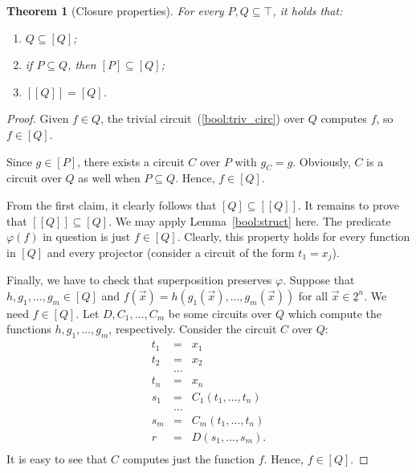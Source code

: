 \documentclass[12pt,notitlepage]{article}
\theoremstyle{plain}
\newtheorem{thm}{Theorem}[section]
\theoremstyle{definition}
\theoremstyle{plain}
\newcommand{\sbs}{\subseteq}
\renewcommand{\phi}{\varphi}
\newcommand{\ul}[1]{\underline{#1}}
\newcommand{\1}{\mathbf{1}}
\newcommand{\0}{\mathbf{0}}
\newcommand{\mcomm}[1]{}
\begin{document}
\mcomm{This lemma reduces the inductive definition for clones to our chosen function `representation', be it a circuit, a formula or whatever. It states that $[Q]$ (as defined in representation terms) is included into every clone containing $Q$. On the other hand, the following theorem implies that $[Q]$ is indeed a clone (that is, $\bot \sbs Q$ and $[Q]$ is closed under superposition) and contains $Q$. So, $[Q]$ is the ${\sbs}$-least clone containing $Q$; this provides an abstraction layer allowing to mention no circuits in most of the subsequent arguments. We do not do so, nevertheless. If the Instructor likes this approach, he might want to add an explicit lemma stating $[Q]$ to be a clone.}
\begin{thm}[Closure properties]\label{bool:closure}
For every $P, Q \sbs \top$, it holds that:
\begin{enumerate}
\item $Q \sbs [Q]$;
\item if $P \sbs Q$, then $[P] \sbs [Q]$;
\item $[[Q]] = [Q]$.
\end{enumerate}
\end{thm}
\begin{proof}
Given $f \in Q$, the trivial circuit~(\ref{bool:triv_circ}) over $Q$ computes $f$, so $f \in [Q]$.

Since $g \in [P]$, there exists a circuit $C$ over $P$ with $g_C = g$. Obviously, $C$ is a circuit over $Q$ as well when $P \sbs Q$. Hence, $f \in [Q]$.

From the first claim, it clearly follows that $[Q] \sbs [[Q]]$. It remains to prove that $[[Q]] \sbs [Q]$. We may apply Lemma~\ref{bool:struct} here. The predicate $\phi(f)$ in question is just $f \in [Q]$. Clearly, this property holds for every function in $[Q]$ and every projector (consider a circuit of the form $t_1 = x_j$).

Finally, we have to check that superposition preserves $\phi$. Suppose that $h, g_1, \ldots, g_m \in [Q]$ and $f(\vec x) = h(g_1(\vec x),\ldots, g_m(\vec x))$ for all $\vec x \in \ul{2}^n$. We need $f \in [Q]$. Let $D, C_1, \ldots, C_m$ be some circuits over $Q$ which compute the functions $h, g_1, \ldots, g_m$, respectively. Consider the circuit $C$ over $Q$:
$$
\begin{array}{rcl}
t_1 &=& x_1\\
t_2 &=& x_2\\
&\ldots&\\
t_n &=& x_n\\
s_1 &=& C_1(t_1, \ldots, t_n)\\
&\ldots&\\
s_m &=& C_m(t_1, \ldots, t_n)\\
r &=& D(s_1,\ldots,s_m).\\
\end{array}
$$
It is easy to see that $C$ computes just the function $f$. Hence, $f \in [Q]$.
\end{proof}
\end{document}
